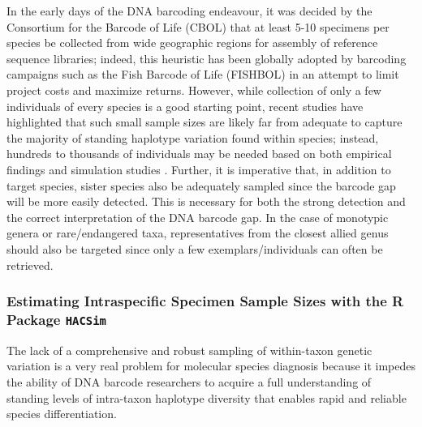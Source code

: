 In the early days of the DNA barcoding endeavour, it was decided by the Consortium for the Barcode of Life (CBOL) that at least 5-10 specimens per species be collected from wide geographic regions for assembly of reference sequence libraries; indeed, this heuristic has been globally adopted by barcoding campaigns such as the Fish Barcode of Life (FISHBOL) \cite{ward2009campaign} in an attempt to limit project costs and maximize returns. However, while collection of only a few individuals of every species is a good starting point, recent studies have highlighted that such small sample sizes are likely far from adequate to capture the majority of standing haplotype variation found within species; instead, hundreds to thousands of individuals may be needed based on both empirical findings and simulation studies \cite{zhang2010estimating, phillips2015exploration, phillips2019incomplete}. Further, it is imperative that, in addition to target species, sister species also be adequately sampled since the barcode gap will be more easily detected. This is necessary for both the strong detection and the correct interpretation of the DNA barcode gap. In the case of monotypic genera or rare/endangered taxa, representatives from the closest allied genus should also be targeted since only a few exemplars/individuals can often be retrieved. 



\subsubsection{Estimating Intraspecific Specimen Sample Sizes with the R Package {\tt HACSim}}

The lack of a comprehensive and robust sampling of within-taxon genetic variation is a very real problem for molecular species diagnosis because it impedes the ability of DNA barcode researchers to acquire a full understanding of standing levels of intra-taxon haplotype diversity that enables rapid and reliable species differentiation.



